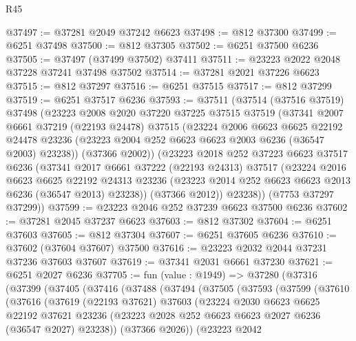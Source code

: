 \begin{lexlean}{R45}
\begin{coremodule}
{@37497 := @37281 @2049 @37242 @6623
@37498 := @812 @37300
@37499 := @6251 @37498
@37500 := @812 @37305
@37502 := @6251 @37500 @6236
@37505 := @37497 (@37499 @37502) @37411
@37511 := @23223 @2022 @2048 @37228 @37241 @37498 @37502
@37514 := @37281 @2021 @37226 @6623
@37515 := @812 @37297
@37516 := @6251 @37515
@37517 := @812 @37299
@37519 := @6251 @37517 @6236
@37593 := @37511
    (@37514
      (@37516 @37519)
      @37498
      (@23223
        @2008
        @2020
        @37220
        @37225
        @37515
        @37519
        (@37341
          @2007
          @6661
          @37219
          (@22193 @24478)
          @37515
          (@23224
            @2006
            @6623
            @6625
            @22192
            @24478
            @23236
            (@23223 @2004 @252 @6623 @6623 @2003 @6236 (@36547 @2003) @23238))
          (@37366 @2002))
        (@23223
          @2018
          @252
          @37223
          @6623
          @37517
          @6236
          (@37341
            @2017
            @6661
            @37222
            (@22193 @24313)
            @37517
            (@23224
              @2016
              @6623
              @6625
              @22192
              @24313
              @23236
              (@23223 @2014 @252 @6623 @6623 @2013 @6236 (@36547 @2013) @23238))
            (@37366 @2012))
          @23238))
      (@7753 @37297 @37299))
@37599 := @23223 @2046 @252 @37239 @6623 @37500 @6236
@37602 := @37281 @2045 @37237 @6623
@37603 := @812 @37302
@37604 := @6251 @37603
@37605 := @812 @37304
@37607 := @6251 @37605 @6236
@37610 := @37602 (@37604 @37607) @37500
@37616 := @23223 @2032 @2044 @37231 @37236 @37603 @37607
@37619 := @37341 @2031 @6661 @37230
@37621 := @6251 @2027 @6236
@37705 := fun (value : @1949) =>
  @37280
    (@37316
      (@37399
        (@37405
          (@37416
            (@37488
              (@37494
                (@37505
                  (@37593
                    (@37599
                      (@37610
                        (@37616
                          (@37619
                            (@22193 @37621)
                            @37603
                            (@23224
                              @2030
                              @6623
                              @6625
                              @22192
                              @37621
                              @23236
                              (@23223 @2028 @252 @6623 @6623 @2027 @6236 (@36547 @2027) @23238))
                            (@37366 @2026))
                          (@23223
                            @2042
}
\end{coremodule}
\end{lexlean}
